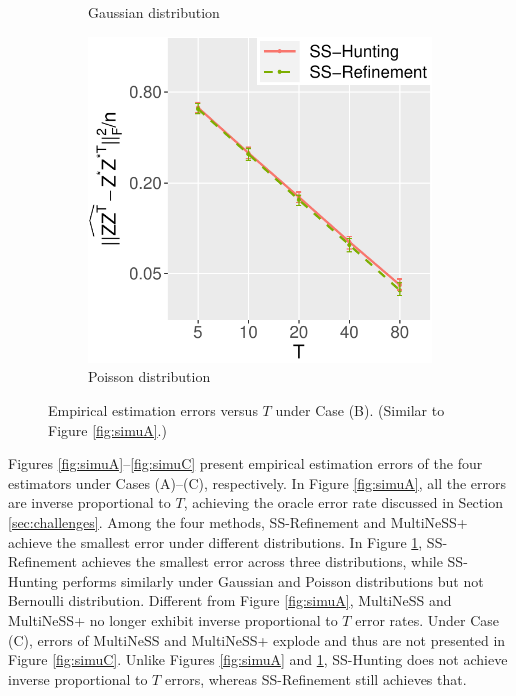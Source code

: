 \documentclass[12pt]{article}
\begin{document}
\begin{figure}
\begin{subfigure}{0.29\textwidth}
    \caption{Gaussian distribution}
\end{subfigure}
\begin{subfigure}{0.29\textwidth}
	\centering
	\includegraphics[width=1\linewidth]{Figures/Simu_PB.pdf}
    \caption{Poisson distribution}
\end{subfigure}
\caption{Empirical estimation errors  versus $T$ under Case (B). (Similar to Figure \ref{fig:simuA}.)}
\label{fig:simuB}
\end{figure}


Figures \ref{fig:simuA}--\ref{fig:simuC} present  empirical estimation errors of the four estimators under Cases (A)--(C), respectively. %
In Figure \ref{fig:simuA}, all the errors are inverse proportional to $T$, achieving the oracle error rate discussed in Section \ref{sec:challenges}. 
Among the four methods, SS-Refinement and MultiNeSS+ achieve the smallest error under different distributions. 
In Figure \ref{fig:simuB}, SS-Refinement achieves the smallest error across three distributions, 
while SS-Hunting performs similarly under Gaussian and Poisson distributions but not Bernoulli distribution. 
Different from Figure \ref{fig:simuA},
MultiNeSS and MultiNeSS+ no longer exhibit inverse proportional to $T$ error rates. 
Under Case (C), errors of MultiNeSS and MultiNeSS+ explode and thus are not presented in Figure \ref{fig:simuC}. 
Unlike Figures \ref{fig:simuA} and \ref{fig:simuB},  
SS-Hunting does not achieve inverse proportional to $T$ errors, whereas SS-Refinement still achieves that. 
\end{document}
